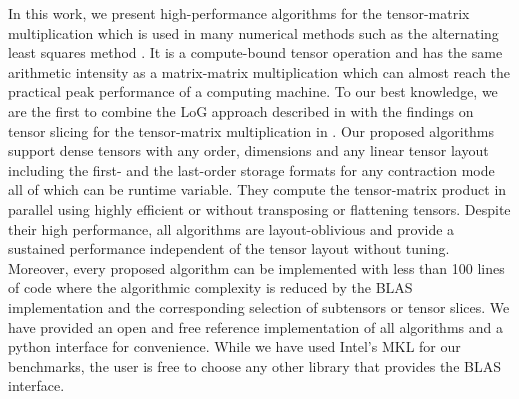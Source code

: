 In this work, we present high-performance algorithms for the tensor-matrix multiplication which is used in many numerical methods such as the alternating least squares method \cite{lee:2018:fundamental, kolda:2009:decompositions}.
It is a compute-bound tensor operation and has the same arithmetic intensity as a matrix-matrix multiplication which can almost reach the practical peak performance of a computing machine.
To our best knowledge, we are the first to combine the LoG approach described in \cite{bassoy:2019:ttv} with the findings on tensor slicing for the tensor-matrix multiplication in \cite{li:2015:input}.
Our proposed algorithms support dense tensors with any order, dimensions and any linear tensor layout including the first- and the last-order storage formats for any contraction mode all of which can be runtime variable.
They compute the tensor-matrix product in parallel using highly efficient  or  without transposing or flattening tensors.
Despite their high performance, all algorithms are layout-oblivious and provide a sustained performance independent of the tensor layout without tuning.
Moreover, every proposed algorithm can be implemented with less than 100 lines of  code where the algorithmic complexity is reduced by the BLAS implementation and the corresponding selection of subtensors or tensor slices.
We have provided an open and free reference  implementation of all algorithms and a python interface for convenience.
While we have used Intel's MKL for our benchmarks, the user is free to choose any other library that provides the BLAS interface.

